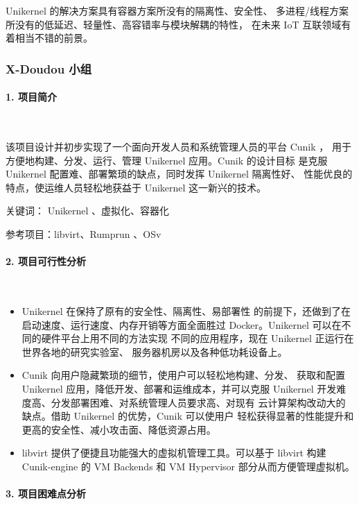 \documentclass[UTF8,fontset=none,linespread=1.15]{ctexart}
\begin{document}
Unikernel 的解决方案具有容器方案所没有的隔离性、安全性、
多进程/线程方案所没有的低延迟、轻量性、高容错率与模块解耦的特性，
在未来 IoT 互联领域有着相当不错的前景。

\subsubsection{X-Doudou 小组}

\paragraph{1. 项目简介}~\par

该项目设计并初步实现了一个面向开发人员和系统管理人员的平台 Cunik ，
用于方便地构建、分发、运行、管理 Unikernel 应用。Cunik 的设计目标
是克服 Unikernel 配置难、部署繁琐的缺点，同时发挥 Unikernel 隔离性好、
性能优良的特点，使运维人员轻松地获益于 Unikernel 这一新兴的技术。

关键词： Unikernel 、虚拟化、容器化

参考项目：libvirt、Rumprun 、OSv

\paragraph{2. 项目可行性分析}~\par

\begin{itemize}
\item Unikernel 在保持了原有的安全性、隔离性、易部署性
的前提下，还做到了在启动速度、运行速度、内存开销等方面全面胜过
 Docker。Unikernel 可以在不同的硬件平台上用不同的方法实现
 不同的应用程序，现在 Unikernel 正运行在世界各地的研究实验室、
 服务器机房以及各种低功耗设备上。
\item Cunik 向用户隐藏繁琐的细节，使用户可以轻松地构建、分发、
获取和配置 Unikernel 应用，降低开发、部署和运维成本，并可以克服
Unikernel 开发难度高、分发部署困难、对系统管理人员要求高、对现有
云计算架构改动大的缺点。借助 Unikernel 的优势，Cunik 可以使用户
轻松获得显著的性能提升和更高的安全性、减小攻击面、降低资源占用。

\item libvirt 提供了便捷且功能强大的虚拟机管理工具。可以基于
 libvirt 构建 Cunik-engine 的 VM Backends 和 VM Hypervisor
  部分从而方便管理虚拟机。
\end{itemize}

\paragraph{3. 项目困难点分析}~\par
\end{document}
